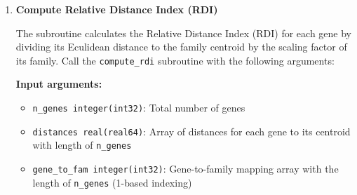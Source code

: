 \documentclass[11pt]{article}
\begin{document}
\begin{enumerate}
\begin{enumerate}
\begin{enumerate}
	      	      	      \textbf{Output arguments:}
	      	      	      \begin{itemize}
	      	      	      	\item \texttt{dscale real(real64)}: Array of scaling factors per
	      	      	      	      family with length of \texttt{n\_families}
	      	      	      	      
	      	      	      	\item \texttt{ierr integer(int32)}: Error code (for error
	      	      	      	      details please check
	      	      	      	      \hyperref[sec:error-handling]{error handling section} )
	      	      	      \end{itemize}
	      	      	      \begin{lstlisting}[language=Fortran, caption={Compute Family Scaling}]
call compute_family_scaling_alloc(n_genes, n_families, distances, &
                                gene_to_fam, dscale, loess_x, &
                                loess_y, indices_used, ierr)
	      	      	      \end{lstlisting}
	      	      	      
	      	      	\item \textbf{Compute Relative Distance Index (RDI)}
	      	      	      
	      	      	      The subroutine calculates the Relative Distance Index (RDI) for each
	      	      	      gene by dividing its Eculidean distance to the family centroid by the
	      	      	      scaling factor of its family. Call the \texttt{compute\_rdi} subroutine
	      	      	      with the following arguments:
	      	      	      
	      	      	      \textbf{Input arguments:}
	      	      	      \begin{itemize}
	      	      	      	\item \texttt{n\_genes integer(int32)}: Total number of genes
	      	      	      	      
	      	      	      	\item \texttt{distances real(real64)}: Array of distances for each
	      	      	      	      gene to its centroid with length of \texttt{n\_genes}
	      	      	      	      
	      	      	      	\item \texttt{gene\_to\_fam integer(int32)}: Gene-to-family mapping
	      	      	      	      array with the length of \texttt{n\_genes} (1-based indexing)
	      	      	      	      

\end{itemize}
\end{enumerate}
\end{enumerate}
\end{enumerate}
\end{document}
